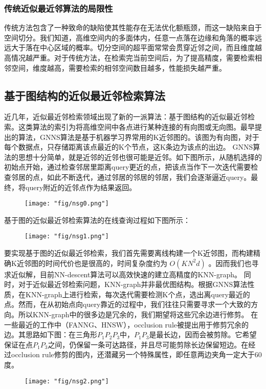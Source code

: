 \subsubsection{传统近似最近邻算法的局限性}
传统方法包含了一种致命的缺陷使其性能存在无法优化额瓶颈，而这一缺陷来自于空间切分。我们知道，高维空间内的多面体内，任意一点落在边缘和角落的概率远远大于落在中心区域的概率。切分空间的超平面常常会贯穿近邻之间，而且维度越高情况越严重。对于传统方法，在检索完当前空间后，为了提高精度，需要检索相邻空间，维度越高，需要检索的相邻空间数目越多，性能损失越严重。
\subsection{基于图结构的近似最近邻检索算法}
近几年，近似最近邻检索领域出现了新的一派算法：基于图结构的近似最近邻检索。这类算法的索引为将高维空间中各点进行某种连接的有向图或无向图。最早提出的算法，GNNS算法是基于机器学习界常用的K近邻图的。该图为有向图，对于每个数据点，只存储距离该点最近的K个节点，这K条边为该点的出边。
GNNS算法的思想十分简单，就是近邻的近邻也很可能是近邻。如下图所示，从随机选择的初始点开始，通过检查邻居里距离query更近的点，把该点当作下一次迭代需要检查邻居的点，如此不断迭代，通过邻居的邻居的邻居，我们会逐渐逼近query。最终，将query附近的近邻点作为结果返回。
\begin{figure}[!h]
	\centering
	\texttt{[image: "fig/nsg0.png"]}
	\caption{}
	\label{fig:nsg0}
\end{figure}
基于图的近似最近邻检索算法的在线查询过程如下图所示：
\begin{figure}[!h]
	\centering
	\texttt{[image: "fig/nsg1.png"]}
	\caption{}
	\label{fig:nsg1}
\end{figure}
要实现基于图的近似最近邻检索，我们首先需要离线构建一个K近邻图，而构建精确K近邻图的时间代价也是很高的，时间复杂度约为 $O(KN^2d)$ 。因而我们也寻求近似解，目前NN-descent算法可以高效快速的建立高精度的KNN-graph。
同时，对于近似最近邻检索问题，KNN-graph并非最优图结构。根据GNNS算法性质，在KNN-graph上进行检索，每次迭代需要检测K个点，选出离query最近的点。然而，在从初始点向query靠近的过程中，我们往往只需要寻求一个大致的方向。所以KNN-graph中的很多边是冗余的，我们期望将这些冗余边进行修剪。
在一些最近的工作中（FANNG、HNSW），occlusion rule被提出用于修剪冗余的边。其思路如下图：在三角形$P_1P_2P_3$中，$P_1P_3$是最长边，因而会被剪除。它希望保证在点$P_1P_3$之间，仍保留一条可达路径，并且尽可能剪除长边保留短边。在经过occlusion rule修剪的图内，还潜藏另一个特殊属性，即任意两边夹角一定大于60度。
\begin{figure}[!h]
	\centering
	\texttt{[image: "fig/nsg2.png"]}
	\caption{}
	\label{fig:nsg2}
\end{figure}
